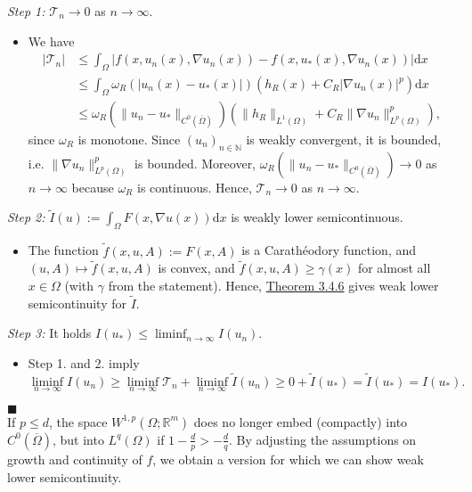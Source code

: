 \textit{Step 1:} $\mathcal{T}_n\to0$ as $n\to\infty$.
\begin{itemize}
	\item[] We have
	\begin{align*}
		\lvert\mathcal{T}_n\rvert&\leq\int_\Omega{\lvert f(x,u_n(x),\nabla u_n(x))-f(x,u_*(x),\nabla u_n(x))\rvert\mathrm{d}x}\\
		&\leq\int_\Omega{\omega_R(\lvert u_n(x)-u_*(x)\rvert)\left(h_R(x)+C_R\lvert\nabla u_n(x)\rvert^p\right)\mathrm{d}x}\\
		&\leq\omega_R\left(\lVert u_n-u_*\rVert_{C^0(\overline{\Omega})}\right)\left(\lVert h_R\rVert_{L^1(\Omega)}+C_R\lVert\nabla u_n\rVert_{L^p(\Omega)}^p\right),
	\end{align*}
	since $\omega_R$ is monotone. Since $(u_n)_{n\in\mathbb{N}}$ is weakly convergent, it is bounded, i.e. $\lVert\nabla u_n\rVert_{L^p(\Omega)}^p$ is bounded. Moreover, $\omega_R(\lVert u_n-u_*\rVert_{C^0(\overline{\Omega})})\to0$ as $n\to\infty$ because $\omega_R$ is continuous. Hence, $\mathcal{T}_n\to0$ as $n\to\infty$.\\
\end{itemize}

\textit{Step 2:} $\tilde{I}(u):=\int_\Omega{F(x,\nabla u(x))\mathrm{d}x}$ is weakly lower semicontinuous.
\begin{itemize}
	\item[] The function $\tilde{f}(x,u,A):=F(x,A)$ is a Carath\'eodory function, and $(u,A)\longmapsto\tilde{f}(x,u,A)$ is convex, and $\tilde{f}(x,u,A)\geq\gamma(x)$ for almost all $x\in\Omega$ (with $\gamma$ from the statement). Hence, \hyperlink{theorem_3_4_6}{Theorem 3.4.6} gives weak lower semicontinuity for $\tilde{I}$.\\
\end{itemize}

\textit{Step 3:} It holds $I(u_*)\leq\liminf_{n\to\infty}{I(u_n)}$.
\begin{itemize}
	\item[] Step 1. and 2. imply
	\[\liminf_{n\to\infty}{I(u_n)}\geq\liminf_{n\to\infty}{\mathcal{T}_n}+\liminf_{n\to\infty}{\tilde{I}(u_n)}\geq0+\tilde{I}(u_*)=\tilde{I}(u_*)=I(u_*).\]
\end{itemize}
\hfill$\blacksquare$\\[11pt]

If $p\leq d$, the space $W^{1,p}(\Omega;\mathbb{R}^m)$ does no longer embed (compactly) into $C^0(\overline{\Omega})$, but into $L^q(\Omega)$ if $1-\frac{d}{p}>-\frac{d}{q}$. By adjusting the assumptions on growth and continuity of $f$, we obtain a version for which we can show weak lower semicontinuity.\\

